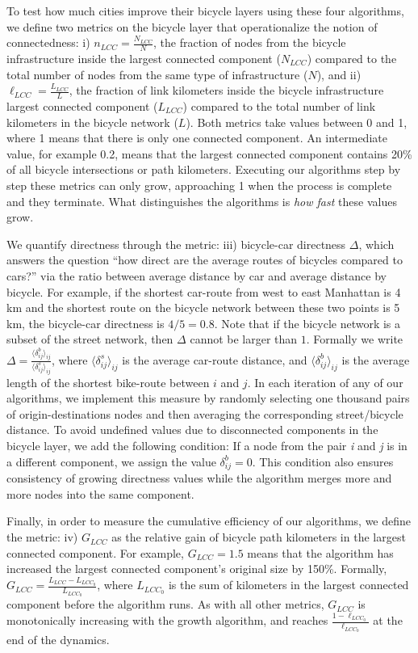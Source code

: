 To test how much cities improve their bicycle layers using these four algorithms, we define two metrics on the bicycle layer that operationalize the notion of connectedness: i) $n_{LCC} = \frac{N_{LCC}}{N} $, the fraction of nodes from the bicycle infrastructure inside the largest connected component ($N_{LCC}$) compared to the total number of nodes from the same type of infrastructure ($N$), and ii) $\ell_{LCC} = \frac{L_{LCC}}{L} $, the fraction of link kilometers inside the bicycle infrastructure largest connected component ($L_{LCC}$) compared to the total number of link kilometers in the bicycle network ($L$). Both metrics take values between 0 and 1, where 1 means that there is only one connected component. An intermediate value, for example 0.2, means that the largest connected component contains 20\% of all bicycle intersections or path kilometers. Executing our algorithms step by step these metrics can only grow, approaching 1 when the process is complete and they terminate. What distinguishes the algorithms is \emph{how fast} these values grow.

We quantify directness through the metric: iii) bicycle-car directness $\Delta$, which answers the question ``how direct are the average routes of bicycles compared to cars?'' via the ratio between average distance by car and average distance by bicycle. For example, if the shortest car-route from west to east Manhattan is 4\,km and the shortest route on the bicycle network between these two points is 5\,km, the bicycle-car directness is $4/5 = 0.8$. Note that if the bicycle network is a subset of the street network, then $\Delta$ cannot be larger than $1$. Formally we write $\Delta=\frac{\langle\delta_{ij}^b\rangle_{ij}}{\langle\delta_{ij}^s\rangle_{ij}}$, where $\langle\delta_{ij}^{s}\rangle_{ij}$ is the average car-route distance, and $\langle\delta_{ij}^{b}\rangle_{ij}$ is the average length of the shortest bike-route between $i$ and $j$. In each iteration of any of our algorithms, we implement this measure by randomly selecting one thousand pairs of origin-destinations nodes and then averaging the corresponding street/bicycle distance. To avoid undefined values due to disconnected components in the bicycle layer, we add the following condition: If a node from the pair \textit{i} and \textit{j} is in a different component, we assign the value $\delta_{ij}^{b} = 0$. This condition also ensures consistency of growing directness values while the algorithm merges more and more nodes into the same component.

Finally, in order to measure the cumulative efficiency of our algorithms, we define the metric: iv) $G_{LCC}$ as the relative gain of bicycle path kilometers in the largest connected component. For example, $G_{LCC}=1.5$ means that the algorithm has increased the largest connected component's original size by 150\%. Formally, $G_{LCC}=\frac{L_{LCC}-L_{LCC_0}}{L_{LCC_0}}$, where $L_{LCC_0}$ is the sum of kilometers in the largest connected component before the algorithm runs. As with all other metrics, $G_{LCC}$ is monotonically increasing with the growth algorithm, and reaches $\frac{1-\ell_{LCC_0}}{\ell_{LCC_0}}$ at the end of the dynamics.

